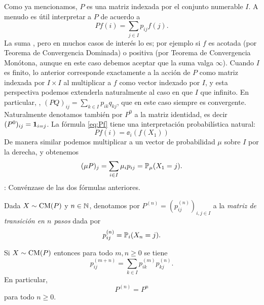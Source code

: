 Como ya mencionamos, $P$ es una matriz indexada por el conjunto numerable $I$.
A menudo es útil interpretar a $P$  de acuerdo a 
\begin{equation}
Pf(i)=\sum_{j\in I}p_{ij}f(j).\label{eq:Pf}
\end{equation}
La suma , pero en muchos casos de interés lo es; por ejemplo si $f$ es acotada (por Teorema de Convergencia Dominada) o positiva (por Teorema de Convergencia Monótona, aunque en este caso debemos aceptar que la suma valga $\infty$).
Cuando $I$ es finito, lo anterior corresponde exactamente a la acción de $P$ como matriz indexada por $I\times I$ al multiplicar a $f$ como vector indexado por $I$, y esta perspectiva podemos extenderla naturalmente al caso en que $I$ que infinito.
\lsep
En particular, , $(PQ)_{ij}=\sum_{k\in I}p_{ik}q_{kj}$, que en este caso siempre es convergente.
Naturalmente denotamos también por $P^0$ a la matriz identidad, es decir $(P^0)_{ij}=\mathbf{1}_{i=j}$.
\lsep
La fórmula \eqref{eq:Pf} tiene una interpretación probabilística natural:
\[Pf(i)=\ee_{i}(f(X_1))\]
De manera similar podemos multiplicar a un vector de probabilidad $\mu$ sobre $I$ por la derecha, y obtenemos
\[(\mu P)_j=\sum_{i\in I}\mu_ip_{ij}=\mathbb{P}_\mu(X_1=j).\]
\uexer: Convénzase de las dos fórmulas anteriores.

\begin{defn}
Dada $X\sim\text{\upshape{CM}}(P)$ y $n\in\mathbb{N}$, denotamos por $P^{(n)}=(p^{(n)}_{ij})_{i,j\in I}$ a la \emph{matriz de transición en $n$ pasos} dada por
\[p^{(n)}_{ij}=\mathbb{P}_i(X_n=j).\]
\end{defn}

\begin{thm}
Si $X\sim\text{\upshape{CM}}(P)$ entonces para todo $m,n\geq0$ se tiene
\[p^{(m+n)}_{ij}=\sum_{k\in I}p^{(m)}_{ik}p^{(n)}_{kj}.\]
En particular, 
\[P^{(n)}=P^n\] 
para todo $n\geq0$.
\end{thm}

